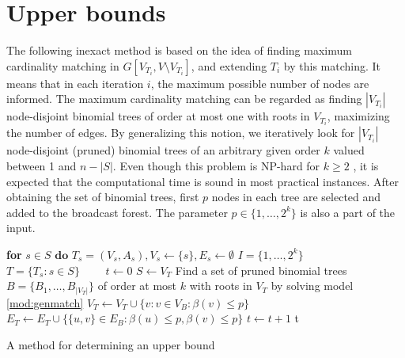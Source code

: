 \section{Upper bounds}

The following inexact method is based on the idea of finding maximum cardinality matching in $G\left[V_{T_i},V\setminus V_{T_i}\right]$, and extending $T_i$ by this matching.
It means that in each iteration $i$, the maximum possible number of nodes are informed.
The maximum cardinality matching can be regarded as finding $|V_{T_i}|$ node-disjoint  binomial trees of order at most one with roots in $V_{T_i}$, maximizing the number of edges.
By generalizing this notion, we iteratively look for $|V_{T_i}|$ node-disjoint (pruned) binomial trees of an arbitrary given order $k$ valued between 1 and $n-|S|$.
Even though this problem is NP-hard for $k\geq 2$ \cite{jansen95}, it is expected that the computational time is sound in most practical instances.
After obtaining the set of binomial trees, first $p$ nodes in each tree are selected and added to the broadcast forest.
The parameter $p\in \{1,\dots,2^k\}$ is also a part of the input.
\begin{algorithm}[]
\textbf{for }$s\in S\textbf{ do }T_s=(V_s,A_s), V_s\leftarrow \{s\}, E_s\leftarrow\emptyset$\;
$I=\{1,\dots,2^k\}$\\
$T=\{T_s:s\in S\}$\ ~~~
$t\leftarrow 0$\;
 {
	$S\leftarrow V_T$\;
	Find a set of pruned binomial trees $B=\{B_1,\dots,B_{|V_T|}\}$ of order at most $k$ with roots in $V_T$ by solving model \eqref{mod:genmatch}\;
	$V_T\leftarrow V_T\cup \{v:v\in V_B:\beta(v)\leq p\}$\;
	$E_T\leftarrow E_T\cup \{\{u,v\}\in E_B: \beta(u)\leq p,\beta(v)\leq p\}$\;
	$t\leftarrow t+1$\;
}
\Return t\;
 \caption{A method for determining an upper bound}
\label{alg:match}
\end{algorithm}

